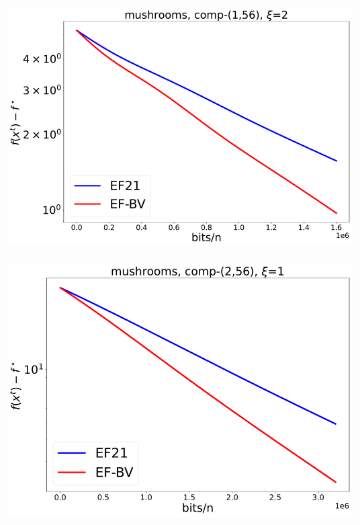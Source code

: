 \documentclass{article} %
\theoremstyle{plain}
\theoremstyle{definition}
\theoremstyle{remark}
\begin{document}
\begin{figure}[!htbp]
\begin{subfigure}[b]{0.32\textwidth}
      \includegraphics[width=\textwidth]{img/mushrooms/CompK_56_1_mushrooms_8124workers_3000K_8124_mushrooms_56_1_1_2_logreg_diff_nonconv.pdf}
   \end{subfigure}
   \hfill
   \begin{subfigure}[b]{0.32\textwidth}
      \centering
      \includegraphics[width=\textwidth]{img/mushrooms/CompK_56_2_mushrooms_8124workers_3000K_8124_mushrooms_56_2_1_1_logreg_diff_nonconv.pdf}
   \end{subfigure}
   \hfill
   \begin{subfigure}[b]{0.32\textwidth}
      \centering

\end{subfigure}
\end{figure}
\end{document}
